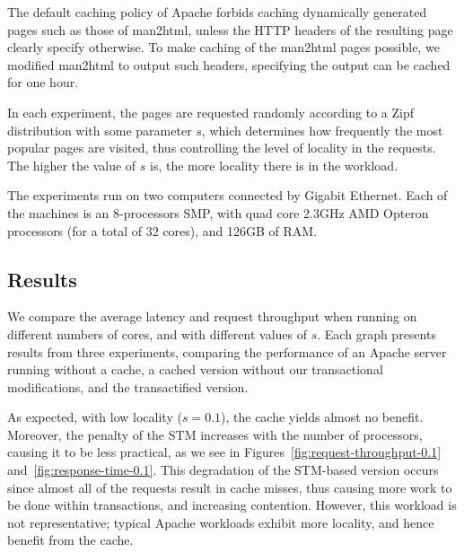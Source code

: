 \documentclass[preprint,11pt]{sigplanconf}
\begin{document}
The default caching policy of Apache forbids caching dynamically generated pages
such as those of man2html, unless the HTTP headers of the resulting page clearly
specify otherwise. To make caching of the man2html pages possible, we modified
man2html to output such headers, specifying the output can be cached for one
hour.

In each experiment, the pages are requested randomly according to a Zipf 
distribution with some parameter $s$, which
determines how frequently the most popular pages are visited,
thus controlling the level of locality in the requests.
The higher the value of $s$ is, the more locality there is in the 
workload.

The experiments run on two computers connected by  Gigabit Ethernet.
Each of the machines is an 8-processors SMP, with quad core 2.3GHz AMD Opteron
processors (for a total of 32 cores), and 126GB of RAM. 

\subsection{Results} 

We compare the average latency and request throughput when running on different
numbers of cores, and with different  values of $s$. Each graph presents 
results from three
experiments, comparing the performance of an Apache server running without a cache, a
cached version without our transactional modifications, and the transactified
version. 

As expected, with low locality ($s=0.1$), the cache yields almost no benefit.
Moreover, the penalty of
the STM increases with the number of processors, causing it to be less
practical, as we see in Figures~\ref{fig:request-throughput-0.1}
and~\ref{fig:response-time-0.1}. This degradation of the STM-based version
occurs since almost all of the requests result in cache
misses, thus causing more work to be done within transactions, 
and increasing contention.  However, this workload is not representative;
typical Apache workloads exhibit more locality, and hence benefit from
the cache.
\end{document}
